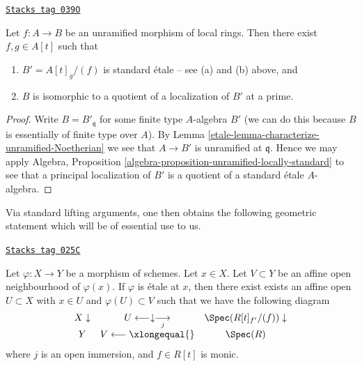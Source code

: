\begin{theorem}
\label{etale-theorem-structure-unramified}
\href{https://stacks.math.columbia.edu/tag/039O}{\texttt{Stacks tag 039O}}

Let $f : A \to B$ be an unramified morphism of local rings.
Then there exist $f, g \in A[t]$ such that
\begin{enumerate}
\item $B' = A[t]_g/(f)$ is standard \'etale -- see (a) and (b) above, and
\item $B$ is isomorphic to a quotient of a localization of $B'$ at a prime.
\end{enumerate}
\end{theorem}

\begin{proof}

Write $B = B'_{\mathfrak q}$ for some finite type $A$-algebra $B'$
(we can do this because $B$ is essentially of finite type over $A$).
By Lemma \ref{etale-lemma-characterize-unramified-Noetherian}
we see that $A \to B'$ is unramified at $\mathfrak q$.
Hence we may apply
Algebra, Proposition \ref{algebra-proposition-unramified-locally-standard}
to see that a principal localization of $B'$ is a quotient of a
standard \'etale $A$-algebra.
\end{proof}

Via standard lifting arguments, one then obtains the following geometric
statement which will be of essential use to us.

\begin{theorem}
\label{etale-theorem-geometric-structure}
\href{https://stacks.math.columbia.edu/tag/025C}{\texttt{Stacks tag 025C}}

Let $\varphi : X \to Y$ be a morphism of schemes. Let $x \in X$.
Let $V \subset Y$ be an affine open neighbourhood of $\varphi(x)$.
If $\varphi$ is \'etale at $x$, then there exist exists an affine open
$U \subset X$ with $x \in U$ and $\varphi(U) \subset V$
such that we have the following diagram
$$
\begin{array}{ccc}X \downarrow & U \longleftarrow\downarrow\underset{j}{\longrightarrow} & \Spec(R[t]_{f'}/(f)) \downarrow \\ Y & V \longleftarrow\xlongequal{} & \Spec(R)\end{array}
$$
where $j$ is an open immersion, and $f \in R[t]$ is monic.
\end{theorem}

